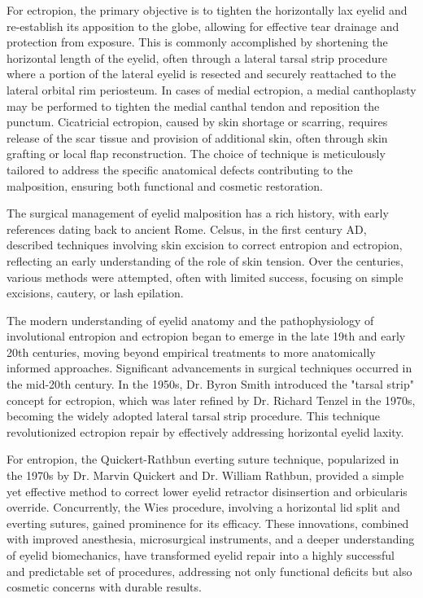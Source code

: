 For ectropion, the primary objective is to tighten the horizontally lax eyelid and re-establish its apposition to the globe, allowing for effective tear drainage and protection from exposure. This is commonly accomplished by shortening the horizontal length of the eyelid, often through a lateral tarsal strip procedure where a portion of the lateral eyelid is resected and securely reattached to the lateral orbital rim periosteum. In cases of medial ectropion, a medial canthoplasty may be performed to tighten the medial canthal tendon and reposition the punctum. Cicatricial ectropion, caused by skin shortage or scarring, requires release of the scar tissue and provision of additional skin, often through skin grafting or local flap reconstruction. The choice of technique is meticulously tailored to address the specific anatomical defects contributing to the malposition, ensuring both functional and cosmetic restoration.

The surgical management of eyelid malposition has a rich history, with early references dating back to ancient Rome. Celsus, in the first century AD, described techniques involving skin excision to correct entropion and ectropion, reflecting an early understanding of the role of skin tension. Over the centuries, various methods were attempted, often with limited success, focusing on simple excisions, cautery, or lash epilation. 

The modern understanding of eyelid anatomy and the pathophysiology of involutional entropion and ectropion began to emerge in the late 19th and early 20th centuries, moving beyond empirical treatments to more anatomically informed approaches. Significant advancements in surgical techniques occurred in the mid-20th century. In the 1950s, Dr. Byron Smith introduced the "tarsal strip" concept for ectropion, which was later refined by Dr. Richard Tenzel in the 1970s, becoming the widely adopted lateral tarsal strip procedure. This technique revolutionized ectropion repair by effectively addressing horizontal eyelid laxity. 

For entropion, the Quickert-Rathbun everting suture technique, popularized in the 1970s by Dr. Marvin Quickert and Dr. William Rathbun, provided a simple yet effective method to correct lower eyelid retractor disinsertion and orbicularis override. Concurrently, the Wies procedure, involving a horizontal lid split and everting sutures, gained prominence for its efficacy. These innovations, combined with improved anesthesia, microsurgical instruments, and a deeper understanding of eyelid biomechanics, have transformed eyelid repair into a highly successful and predictable set of procedures, addressing not only functional deficits but also cosmetic concerns with durable results.

